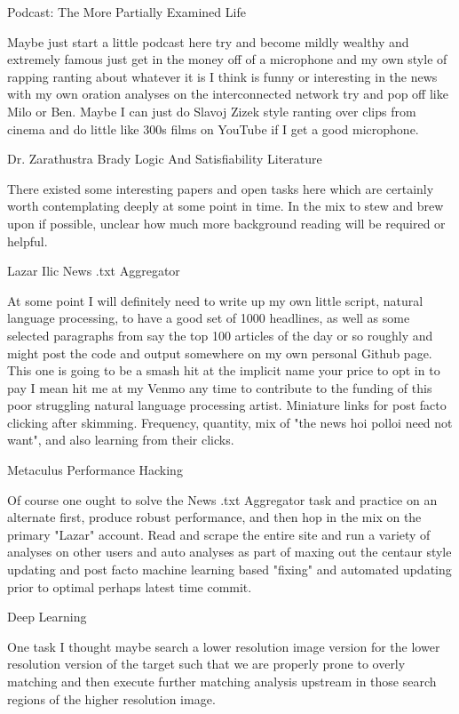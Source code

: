 	Podcast: The More Partially Examined Life

Maybe just start a little podcast here try and become mildly wealthy and extremely famous just get in the money off of a microphone and my own style of rapping ranting about whatever it is I think is funny or interesting in the news with my own oration analyses on the interconnected network try and pop off like Milo or Ben. Maybe I can just do Slavoj Zizek style ranting over clips from cinema and do little like 300s films on YouTube if I get a good microphone.

	Dr. Zarathustra Brady Logic And Satisfiability Literature

There existed some interesting papers and open tasks here which are certainly worth contemplating deeply at some point in time. In the mix to stew and brew upon if possible, unclear how much more background reading will be required or helpful.

	Lazar Ilic News .txt Aggregator

At some point I will definitely need to write up my own little script, natural language processing, to have a good set of 1000 headlines, as well as some selected paragraphs from say the top 100 articles of the day or so roughly and might post the code and output somewhere on my own personal Github page. This one is going to be a smash hit at the implicit name your price to opt in to pay I mean hit me at my Venmo any time to contribute to the funding of this poor struggling natural language processing artist. Miniature links for post facto clicking after skimming. Frequency, quantity, mix of "the news hoi polloi need not want", and also learning from their clicks.

	Metaculus Performance Hacking

Of course one ought to solve the News .txt Aggregator task and practice on an alternate first, produce robust performance, and then hop in the mix on the primary "Lazar" account. Read and scrape the entire site and run a variety of analyses on other users and auto analyses as part of maxing out the centaur style updating and post facto machine learning based "fixing" and automated updating prior to optimal perhaps latest time commit.

	Deep Learning

One task I thought maybe search a lower resolution image version for the lower resolution version of the target such that we are properly prone to overly matching and then execute further matching analysis upstream in those search regions of the higher resolution image.

